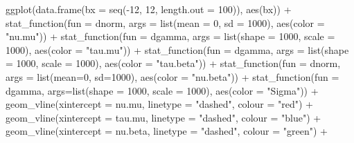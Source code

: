 \documentclass[
]{article}
\newenvironment{Shaded}{\begin{snugshade}}{\end{snugshade}}
\newcommand{\AttributeTok}[1]{\textcolor[rgb]{0.77,0.63,0.00}{#1}}
\newcommand{\DecValTok}[1]{\textcolor[rgb]{0.00,0.00,0.81}{#1}}
\newcommand{\FunctionTok}[1]{\textcolor[rgb]{0.00,0.00,0.00}{#1}}
\newcommand{\NormalTok}[1]{#1}
\newcommand{\SpecialCharTok}[1]{\textcolor[rgb]{0.00,0.00,0.00}{#1}}
\newcommand{\StringTok}[1]{\textcolor[rgb]{0.31,0.60,0.02}{#1}}
\begin{document}
\begin{Shaded}
\begin{Highlighting}[]
\FunctionTok{ggplot}\NormalTok{(}\FunctionTok{data.frame}\NormalTok{(}\AttributeTok{bx =} \FunctionTok{seq}\NormalTok{(}\SpecialCharTok{{-}}\DecValTok{12}\NormalTok{, }\DecValTok{12}\NormalTok{, }\AttributeTok{length.out =} \DecValTok{100}\NormalTok{)), }\FunctionTok{aes}\NormalTok{(bx)) }\SpecialCharTok{+}
  \FunctionTok{stat\_function}\NormalTok{(}\AttributeTok{fun =}\NormalTok{ dnorm, }\AttributeTok{args =} \FunctionTok{list}\NormalTok{(}\AttributeTok{mean =} \DecValTok{0}\NormalTok{, }\AttributeTok{sd =} \DecValTok{1000}\NormalTok{), }\FunctionTok{aes}\NormalTok{(}\AttributeTok{color =} \StringTok{"nu.mu"}\NormalTok{)) }\SpecialCharTok{+} 
  \FunctionTok{stat\_function}\NormalTok{(}\AttributeTok{fun =}\NormalTok{ dgamma, }\AttributeTok{args =} \FunctionTok{list}\NormalTok{(}\AttributeTok{shape =} \DecValTok{1000}\NormalTok{, }\AttributeTok{scale =} \DecValTok{1000}\NormalTok{), }\FunctionTok{aes}\NormalTok{(}\AttributeTok{color =} \StringTok{"tau.mu"}\NormalTok{)) }\SpecialCharTok{+} 
  \FunctionTok{stat\_function}\NormalTok{(}\AttributeTok{fun =}\NormalTok{ dgamma, }\AttributeTok{args =} \FunctionTok{list}\NormalTok{(}\AttributeTok{shape =} \DecValTok{1000}\NormalTok{, }\AttributeTok{scale =} \DecValTok{1000}\NormalTok{), }\FunctionTok{aes}\NormalTok{(}\AttributeTok{color =} \StringTok{"tau.beta"}\NormalTok{)) }\SpecialCharTok{+} 
  \FunctionTok{stat\_function}\NormalTok{(}\AttributeTok{fun =}\NormalTok{ dnorm, }\AttributeTok{args =} \FunctionTok{list}\NormalTok{(}\AttributeTok{mean=}\DecValTok{0}\NormalTok{, }\AttributeTok{sd=}\DecValTok{1000}\NormalTok{), }\FunctionTok{aes}\NormalTok{(}\AttributeTok{color =} \StringTok{"nu.beta"}\NormalTok{)) }\SpecialCharTok{+} 
  \FunctionTok{stat\_function}\NormalTok{(}\AttributeTok{fun =}\NormalTok{ dgamma, }\AttributeTok{args=}\FunctionTok{list}\NormalTok{(}\AttributeTok{shape =} \DecValTok{1000}\NormalTok{, }\AttributeTok{scale =} \DecValTok{1000}\NormalTok{), }\FunctionTok{aes}\NormalTok{(}\AttributeTok{color =} \StringTok{"Sigma"}\NormalTok{)) }\SpecialCharTok{+}
  \FunctionTok{geom\_vline}\NormalTok{(}\AttributeTok{xintercept =}\NormalTok{ nu.mu, }\AttributeTok{linetype =} \StringTok{"dashed"}\NormalTok{, }\AttributeTok{colour =} \StringTok{"red"}\NormalTok{) }\SpecialCharTok{+}
  \FunctionTok{geom\_vline}\NormalTok{(}\AttributeTok{xintercept =}\NormalTok{ tau.mu, }\AttributeTok{linetype =} \StringTok{"dashed"}\NormalTok{, }\AttributeTok{colour =} \StringTok{"blue"}\NormalTok{) }\SpecialCharTok{+}
  \FunctionTok{geom\_vline}\NormalTok{(}\AttributeTok{xintercept =}\NormalTok{ nu.beta, }\AttributeTok{linetype =} \StringTok{"dashed"}\NormalTok{, }\AttributeTok{colour =} \StringTok{"green"}\NormalTok{) }\SpecialCharTok{+}

\end{Highlighting}
\end{Shaded}
\end{document}
